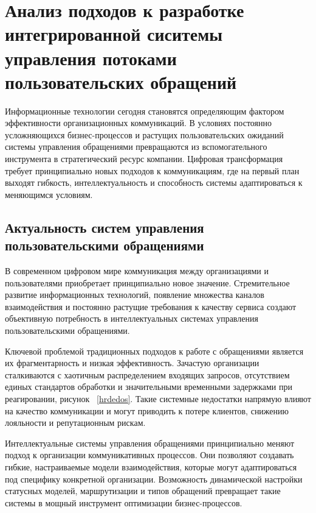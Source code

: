 \section{Анализ подходов к разработке интегрированной сиситемы управления потоками пользовательских обращений}
\label{sec:analysis}

Информационные технологии сегодня становятся определяющим фактором эффективности организационных коммуникаций. В условиях постоянно усложняющихся бизнес-процессов и растущих пользовательских ожиданий системы управления обращениями превращаются из вспомогательного инструмента в стратегический ресурс компании. Цифровая трансформация требует принципиально новых подходов к коммуникациям, где на первый план выходят гибкость, интеллектуальность и способность системы адаптироваться к меняющимся условиям.

\subsection{Актуальность систем управления пользовательскими обращениями}

В современном цифровом мире коммуникация между организациями и пользователями приобретает принципиально новое значение. Стремительное развитие информационных технологий, появление множества каналов взаимодействия и постоянно растущие требования к качеству сервиса создают объективную потребность в интеллектуальных системах управления пользовательскими обращениями.

Ключевой проблемой традиционных подходов к работе с обращениями является их фрагментарность и низкая эффективность. Зачастую организации сталкиваются с хаотичным распределением входящих запросов, отсутствием единых стандартов обработки и значительными временными задержками при реагировании, рисунок ~\ref{hrdedos}. Такие системные недостатки напрямую влияют на качество коммуникации и могут приводить к потере клиентов, снижению лояльности и репутационным рискам.


Интеллектуальные системы управления обращениями принципиально меняют подход к организации коммуникативных процессов. Они позволяют создавать гибкие, настраиваемые модели взаимодействия, которые могут адаптироваться под специфику конкретной организации. Возможность динамической настройки статусных моделей, маршрутизации и типов обращений превращает такие системы в мощный инструмент оптимизации бизнес-процессов.

